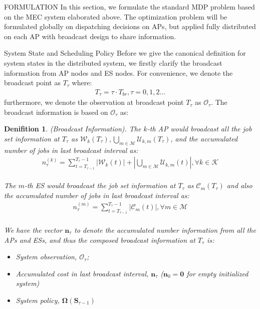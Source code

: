 \documentclass[10pt, conference, letterpaper]{IEEEtran}
\newtheorem{definition}{Denifition}
\renewcommand{\vec}{\mathbf}
\newcommand{\apSet}{\mathcal{K}}
\newcommand{\esSet}{\mathcal{M}}
\newcommand{\wSet}{\mathcal{W}}
\newcommand{\uSet}{\mathcal{U}}
\newcommand{\cSet}{\mathcal{C}}
\newcommand{\Stat}{\mathbf{S}}
\newcommand{\Obsv}{\mathcal{O}}
\newcommand{\Policy}{\mathbf{\Omega}}
\begin{document}
    \begin{section}{FORMULATION}
        \label{sec:formulation}
        In this section, we formulate the standard MDP problem based on the MEC system elaborated above. The optimization problem will be formulated globally on dispatching decisions on APs, but applied fully distributed on each AP with broadcast design to share information.

        \begin{subsection}{System State and Scheduling Policy}
            Before we give the canonical definition for system states in the distributed system, we firstly clarify the broadcast information from AP nodes and ES nodes. For convenience, we denote the broadcast point as $T_\tau$ where:
            \begin{align}
                T_\tau = \tau \cdot T_{br}, \tau=0,1,2\dots
            \end{align}
            furthermore, we denote the observation at broadcast point $T_\tau$ as $\Obsv_\tau$. The broadcast information is based on $\Obsv_\tau$ as:
            \begin{definition}(Broadcast Information).
                The $k$-th AP would broadcast all the job set information at $T_\tau$ as $\wSet_{k}(T_\tau), \bigcup\limits_{m\in\esSet}\uSet_{k,m}(T_\tau)$, and the accumulated number of jobs in last broadcast interval as:
                \begin{align}
                    n^{(k)}_\tau = \sum_{t=T_{\tau-1}}^{T_\tau-1} |\wSet_{k}(t)| + |\bigcup\limits_{m\in\esSet}\uSet_{k,m}(t)|,\forall k \in \apSet
                \end{align}
                \\
                The $m$-th ES would broadcast the job set information at $T_\tau$ as $\cSet_{m}(T_\tau)$ and also the accumulated number of jobs in last broadcast interval as:
                \begin{align}
                    n^{(m)}_\tau = \sum_{t=T_{\tau-1}}^{T_\tau-1} |\cSet_{m}(t)|,\forall m \in \esSet
                \end{align}
                \\
                We have the vector $\vec{n}_\tau$ to denote the accumulated number information from all the APs and ESs, and thus the composed broadcast information at $T_\tau$ is:
                \begin{itemize}
                    \item System observation, $\Obsv_\tau$;
                    \item Accumulated cost in last broadcast interval, $\vec{n}_\tau$ ($\vec{n}_0=\mathbf{0}$ for empty initialized system)
                    \item System policy, $\Policy(\Stat_{\tau-1})$
                \end{itemize}
            \end{definition}


\end{subsection}
\end{section}
\end{document}
